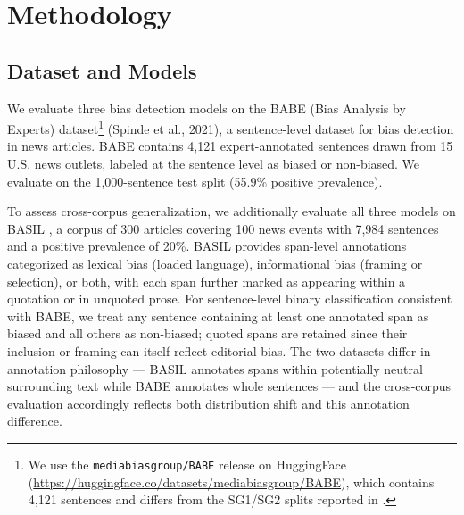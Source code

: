 \documentclass[11pt]{article}
\begin{document}

\section{Methodology}

\subsection{Dataset and Models}

We evaluate three bias detection models on the BABE 
(Bias Analysis by Experts) dataset\footnote{We use the \texttt{mediabiasgroup/BABE} release on 
HuggingFace (\url{https://huggingface.co/datasets/mediabiasgroup/BABE}), 
which contains 4{,}121 sentences and differs from the SG1/SG2 
splits reported in \citet{spinde2021babe}.} 
(Spinde et al., 2021), a sentence-level dataset for 
bias detection in news articles. BABE contains 4,121 expert-annotated sentences drawn from 15 U.S. news outlets, labeled at the sentence level as biased or non-biased. We evaluate on the 1,000-sentence test split (55.9\% positive prevalence).

To assess cross-corpus generalization, we additionally evaluate all 
three models on BASIL \cite{fan-etal-2019-plain}, a corpus of 300 
articles covering 100 news events with 7{,}984 sentences and a 
positive prevalence of 20\%. BASIL provides span-level annotations categorized 
as lexical bias (loaded language), informational bias (framing or 
selection), or both, with each span further marked as appearing within 
a quotation or in unquoted prose. For sentence-level binary 
classification consistent with BABE, we treat any sentence containing 
at least one annotated span as biased and all others as non-biased; 
quoted spans are retained since their inclusion or framing can itself 
reflect editorial bias. The two datasets differ in annotation 
philosophy --- BASIL annotates spans within potentially neutral 
surrounding text while BABE annotates whole sentences --- and the 
cross-corpus evaluation accordingly reflects both distribution shift 
and this annotation difference.

\end{document}
